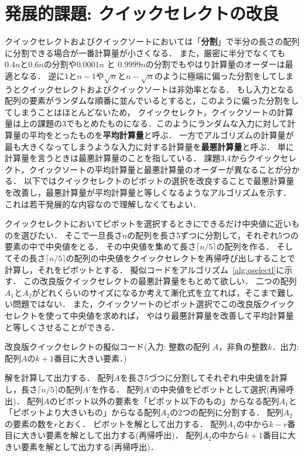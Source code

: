 \documentclass[a4paper,twoside,onecolumn,openany,article]{memoir}
\theoremstyle{remark}
\begin{document}
\section*{発展的課題: クイックセレクトの改良}
クイックセレクトおよびクイックソートにおいては「\textbf{分割}」で半分の長さの配列に分割できる場合が一番計算量が小さくなる．
また，厳密に半分でなくても$0.4 n$と$0.6n$の分割や$0.0001 n$ と $0.9999 n$の分割でもやはり計算量のオーダーは最適となる．
逆に$1$と$n-1$や$\sqrt{n}$と$n-\sqrt{n}$のように極端に偏った分割をしてしまうとクイックセレクトおよびクイックソートは非効率となる．
もし入力となる配列の要素がランダムな順番に並んでいるとすると，このように偏った分割をしてしまうことはほとんどないため，
クイックセレクト，クイックソートの計算量は上の課題の3でもとめたものになる．このようにランダムな入力に対して計算量の平均をとったものを\textbf{平均計算量}と呼ぶ．
一方でアルゴリズムの計算量が最も大きくなってしまうような入力に対する計算量を\textbf{最悪計算量}と呼ぶ．
単に計算量を言うときは最悪計算量のことを指している．
課題3,4からクイックセレクト，クイックソートの平均計算量と最悪計算量のオーダーが異なることが分かる．
以下ではクイックセレクトのピボットの選択を改良することで最悪計算量を改善し，最悪計算量が平均計算量と等しくなるようなアルゴリズムを示す．
これは若干発展的な内容なので理解しなくてもよい．

クイックセレクトにおいてピボットを選択するときにできるだけ中央値に近いものを選びたい．
そこで一旦長さ$n$の配列を長さ5ずつに分割して，それぞれ5つの要素の中で中央値をとる．
その中央値を集めて長さ$\lceil n/5\rceil$の配列を作る．
そしてその長さ$\lceil n/5\rceil$の配列の中央値をクイックセレクトを再帰呼び出しすることで計算し，それをピボットとする．
擬似コードをアルゴリズム~\ref{alg:qselectl}に示す．
この改良版クイックセレクトの最悪計算量をもとめて欲しい．
二つの配列$A_1$と$A_2$がどれくらいのサイズになるか考えて漸化式を立てれば，そこまで難しい問題ではない．
また，クイックソートのピボット選択でこの改良版クイックセレクトを使って中央値を求めれば，
やはり最悪計算量を改善して平均計算量と等しくさせることができる．


\begin{algorithm}
\caption{改良版クイックセレクトの擬似コード(入力: 整数の配列 $A$，非負の整数$k$．出力: 配列$A$の$k+1$番目に大きい要素．)}
\label{alg:qselectl}
\begin{algorithmic}
  \State 解を計算して出力する．
\Else
  \State 配列$A$を長さ5づつに分割してそれぞれ中央値を計算し，長さ$\lceil n/5\rceil$の配列$A'$を作る．
  \State 配列$A'$の中央値をピボットとして選択(再帰呼出)．
  \State 配列$A$のピボット以外の要素を「ピボット以下のもの」からなる配列$A_1$と「ピボットより大きいもの」からなる配列$A_2$の2つの配列に分割する．
  \State 配列$A_2$の要素の数を$r$とおく．
    \State ピボットを解として出力する．
    \State 配列$A_1$の中から$k-r$番目に大きい要素を解として出力する(再帰呼出)．
  \Else
    \State 配列$A_2$の中から$k+1$番目に大きい要素を解として出力する(再帰呼出)．
  \EndIf
\EndIf
\end{algorithmic}
\end{algorithm}
\end{document}
